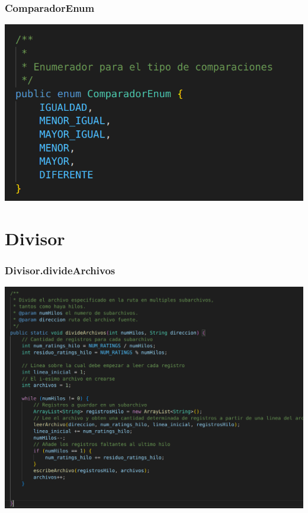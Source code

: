 \documentclass{beamer}
\begin{document}
\begin{frame}
\frametitle{ComparadorEnum}
\includegraphics[width=\linewidth]{comparadorenum}
\end{frame}

\section{Divisor}

\begin{frame}
\frametitle{Divisor.divideArchivos}
\includegraphics[width=\linewidth]{divisor_dividearchivos}
\end{frame}
\end{document}
